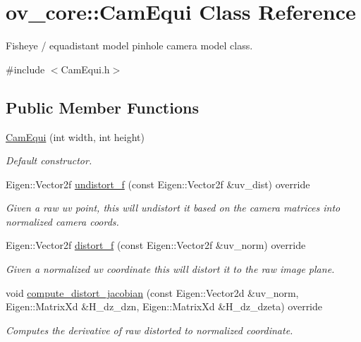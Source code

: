 \hypertarget{classov__core_1_1CamEqui}{}\section{ov\+\_\+core\+:\+:Cam\+Equi Class Reference}
\label{classov__core_1_1CamEqui}


Fisheye / equadistant model pinhole camera model class.  




{\ttfamily \#include $<$Cam\+Equi.\+h$>$}

\subsection*{Public Member Functions}
\begin{DoxyCompactItemize}
\item 
\hyperlink{classov__core_1_1CamEqui_aac99e3cb833ebf47a7ba2db390ba5f66}{Cam\+Equi} (int width, int height)
\begin{DoxyCompactList}\small\item\em Default constructor. \end{DoxyCompactList}\item 
Eigen\+::\+Vector2f \hyperlink{classov__core_1_1CamEqui_a737d6b4b634ae1da976d362158323059}{undistort\+\_\+f} (const Eigen\+::\+Vector2f \&uv\+\_\+dist) override
\begin{DoxyCompactList}\small\item\em Given a raw uv point, this will undistort it based on the camera matrices into normalized camera coords. \end{DoxyCompactList}\item 
Eigen\+::\+Vector2f \hyperlink{classov__core_1_1CamEqui_ac35e3814d053f66a32644321691d8e0f}{distort\+\_\+f} (const Eigen\+::\+Vector2f \&uv\+\_\+norm) override
\begin{DoxyCompactList}\small\item\em Given a normalized uv coordinate this will distort it to the raw image plane. \end{DoxyCompactList}\item 
void \hyperlink{classov__core_1_1CamEqui_a68692045d866fbd508a30aab7f3b0637}{compute\+\_\+distort\+\_\+jacobian} (const Eigen\+::\+Vector2d \&uv\+\_\+norm, Eigen\+::\+Matrix\+Xd \&H\+\_\+dz\+\_\+dzn, Eigen\+::\+Matrix\+Xd \&H\+\_\+dz\+\_\+dzeta) override
\begin{DoxyCompactList}\small\item\em Computes the derivative of raw distorted to normalized coordinate. \end{DoxyCompactList}\end{DoxyCompactItemize}
